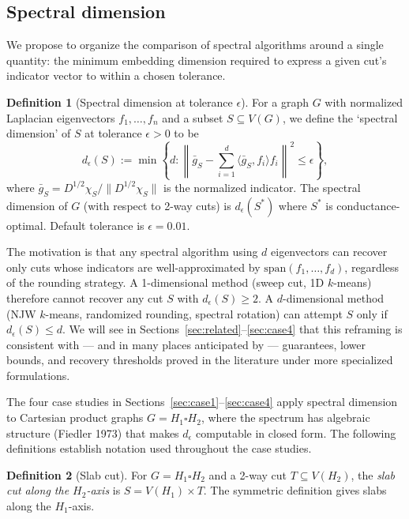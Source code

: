 \documentclass{article}
\theoremstyle{definition}
\newtheorem{definition}{Definition}
\theoremstyle{remark}
\begin{document}
\subsection{Spectral dimension}
\label{sec:def}

We propose to organize the comparison of spectral algorithms around a single quantity: the minimum embedding dimension required to express a given cut's indicator vector to within a chosen tolerance.

\begin{definition}[Spectral dimension at tolerance $\epsilon$]
\label{def:spectral-dim}
For a graph $G$ with normalized Laplacian eigenvectors $f_1, \ldots, f_n$ and a subset $S \subseteq V(G)$, we define the `spectral dimension' of $S$ at tolerance $\epsilon > 0$ to be
\[
d_\epsilon(S) := \min\!\left\{ d : \left\| \bar g_S - \sum_{i=1}^d \langle \bar g_S, f_i \rangle f_i \right\|^2 \leq \epsilon \right\},
\]
where $\bar g_S = D^{1/2}\chi_S / \|D^{1/2}\chi_S\|$ is the normalized indicator. The spectral dimension of $G$ (with respect to 2-way cuts) is $d_\epsilon(S^*)$ where $S^*$ is conductance-optimal. Default tolerance is $\epsilon = 0.01$.
\end{definition}

The motivation is that any spectral algorithm using $d$ eigenvectors can recover only cuts whose indicators are well-approximated by $\mathrm{span}(f_1, \ldots, f_d)$, regardless of the rounding strategy. A 1-dimensional method (sweep cut, 1D $k$-means) therefore cannot recover any cut $S$ with $d_\epsilon(S) \geq 2$. A $d$-dimensional method (NJW $k$-means, randomized rounding, spectral rotation) can attempt $S$ only if $d_\epsilon(S) \leq d$. We will see in Sections~\ref{sec:related}--\ref{sec:case4} that this reframing is consistent with --- and in many places anticipated by --- guarantees, lower bounds, and recovery thresholds proved in the literature under more specialized formulations.

The four case studies in Sections~\ref{sec:case1}--\ref{sec:case4} apply spectral dimension to Cartesian product graphs $G = H_1 \square H_2$, where the spectrum has algebraic structure (Fiedler 1973) that makes $d_\epsilon$ computable in closed form. The following definitions establish notation used throughout the case studies.

\begin{definition}[Slab cut]
\label{def:slab}
For $G = H_1 \square H_2$ and a 2-way cut $T \subseteq V(H_2)$, the \emph{slab cut along the $H_2$-axis} is $S = V(H_1) \times T$. The symmetric definition gives slabs along the $H_1$-axis.
\end{definition}
\end{document}
